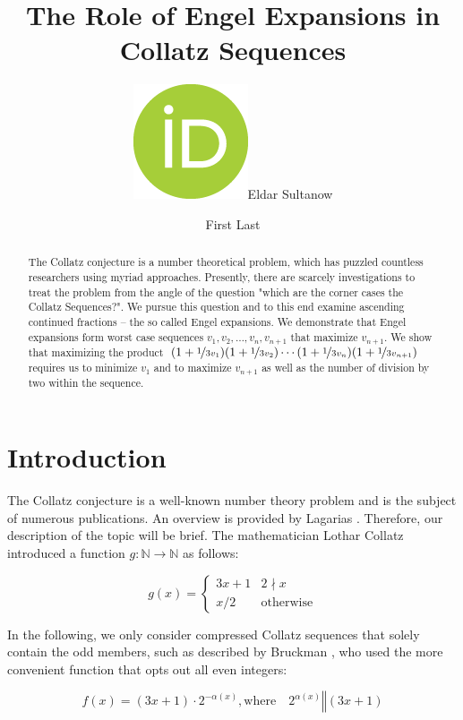 \documentclass[12pt]{amsart}
\title[Engel Expansions in Collatz Sequences]{The Role of Engel Expansions in Collatz Sequences}
\author[F.\ Last1]{\href{https://orcid.org/0000-0001-5257-2236}{\includegraphics[scale=0.06]{orcid.png}}\hspace{1mm}Eldar Sultanow}
\author[F.\ Last2]{First Last}
\theoremstyle{definition}
\begin{document}
	
\begingroup
\let\MakeUppercase\relax
\maketitle
\endgroup

\begin{abstract}
The Collatz conjecture is a number theoretical problem, which has puzzled countless researchers using myriad approaches. Presently, there are scarcely investigations to treat the problem from the angle of the question "which are the corner cases the Collatz Sequences?". We pursue this question and to this end examine ascending continued fractions -- the so called Engel expansions. We demonstrate that Engel expansions form worst case sequences $v_1,v_2,\ldots,v_n,v_{n+1}$ that maximize $v_{n+1}$. We show that maximizing the product $(1+\nicefrac{1}{3v_1})(1+\nicefrac{1}{3v_2})\cdots(1+\nicefrac{1}{3v_n})(1+\nicefrac{1}{3v_{n+1}})$ requires us to minimize $v_1$ and to maximize $v_{n+1}$ as well as the number of division by two within the sequence.
\end{abstract}

\section{Introduction}
\label{introduction}
The Collatz conjecture is a well-known number theory problem and is the subject of numerous publications. An overview is provided by Lagarias \cite{Ref_Lagarias_2010}. Therefore, our description of the topic will be brief. The mathematician Lothar Collatz introduced a function $g:\mathbb{N}\rightarrow\mathbb{N}$ as follows:

\begin{equation}
\label{eq:func_collatz}
g(x)=
\begin{cases}
3x+1	&	2\nmid x\\
x/2		&	\text{otherwise}
\end{cases}
\end{equation}

\par\medskip
In the following, we only consider compressed Collatz sequences that solely contain the odd members, such as described by Bruckman \cite{Ref_Bruckman_2008}, who used the more convenient function that opts out all even integers:

\begin{equation}
\label{eq:func_collatz_odd}
f(x)=(3x+1)\cdot2^{-\alpha(x)},\text{where}\hspace{1em}2^{\alpha(x)}\mathrel\Vert(3x+1)
\end{equation}
\end{document}
